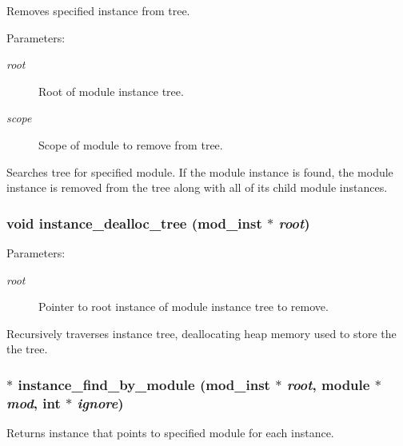 Removes specified instance from tree. 

\begin{Desc}
\item[Parameters:]
\begin{description}
\item[{\em root}]Root of module instance tree. \item[{\em scope}]Scope of module to remove from tree.\end{description}
\end{Desc}
Searches tree for specified module. If the module instance is found, the module instance is removed from the tree along with all of its child module instances. 
\subsubsection{\setlength{\rightskip}{0pt plus 5cm}void instance\_\-dealloc\_\-tree ({\bf mod\_\-inst} $\ast$ {\em root})}\label{instance_8c_a11}


\begin{Desc}
\item[Parameters:]
\begin{description}
\item[{\em root}]Pointer to root instance of module instance tree to remove.\end{description}
\end{Desc}
Recursively traverses instance tree, deallocating heap memory used to store the the tree. 
\subsubsection{$\ast$ instance\_\-find\_\-by\_\-module ({\bf mod\_\-inst} $\ast$ {\em root}, {\bf module} $\ast$ {\em mod}, int $\ast$ {\em ignore})}\label{instance_8c_a4}


Returns instance that points to specified module for each instance. 

